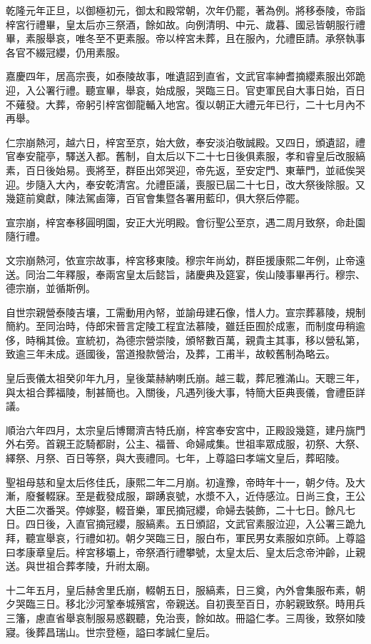 \begin{pinyinscope}
乾隆元年正旦，以御極初元，御太和殿常朝，次年仍罷，著為例。將移泰陵，帝詣梓宮行禮畢，皇太后亦三祭酒，餘如故。向例清明、中元、歲暮、國忌皆朝服行禮畢，素服舉哀，唯冬至不更素服。帝以梓宮未葬，且在服內，允禮臣請。承祭執事各官不綴冠纓，仍用素服。

嘉慶四年，居高宗喪，如泰陵故事，唯遺詔到直省，文武官率紳耆摘纓素服出郊跪迎，入公署行禮。聽宣畢，舉哀，始成服，哭臨三日。官吏軍民自大事日始，百日不薙發。大葬，帝躬引梓宮御龍輴入地宮。復以朝正大禮元年已行，二十七月內不再舉。

仁宗崩熱河，越六日，梓宮至京，始大斂，奉安淡泊敬誠殿。又四日，頒遺詔，禮官奉安龍亭，驛送入都。舊制，自太后以下二十七日後俱素服，孝和睿皇后改服縞素，百日後始易。喪將至，群臣出郊哭迎，帝先返，至安定門、東華門，並祗俟哭迎。步隨入大內，奉安乾清宮。允禮臣議，喪服已屆二十七日，改大祭後除服。又幾筵前奠獻，陳法駕鹵簿，百官會集暨各署用藍印，俱大祭后停罷。

宣宗崩，梓宮奉移圓明園，安正大光明殿。會衍聖公至京，遇二周月致祭，命赴園隨行禮。

文宗崩熱河，依宣宗故事，梓宮移東陵。穆宗年尚幼，群臣援康熙二年例，止帝遠送。同治二年釋服，奉兩宮皇太后懿旨，諸慶典及筵宴，俟山陵事畢再行。穆宗、德宗崩，並循斯例。

自世宗親營泰陵吉壤，工需動用內帑，並諭毋建石像，惜人力。宣宗葬慕陵，規制簡約。至同治時，侍郎宋晉言定陵工程宜法慕陵，雖廷臣囿於成憲，而制度毋稍逾侈，時稱其儉。宣統初，為德宗營崇陵，頒帑數百萬，親貴主其事，移以營私第，致逾三年未成。遜國後，當道撥款營治，及葬，工甫半，故較舊制為略云。

皇后喪儀太祖癸卯年九月，皇後葉赫納喇氏崩。越三載，葬尼雅滿山。天聰三年，與太祖合葬福陵，制甚簡也。入關後，凡遇列後大事，特簡大臣典喪儀，會禮臣詳議。

順治六年四月，太宗皇后博爾濟吉特氏崩，梓宮奉安宮中，正殿設幾筵，建丹旐門外右旁。首親王訖騎都尉，公主、福晉、命婦咸集。世祖率眾成服，初祭、大祭、繹祭、月祭、百日等祭，與大喪禮同。七年，上尊謚曰孝端文皇后，葬昭陵。

聖祖母慈和皇太后佟佳氏，康熙二年二月崩。初違豫，帝時年十一，朝夕侍。及大漸，廢餐輟寐。至是截發成服，躃踴哀號，水漿不入，近侍感泣。日尚三食，王公大臣二次番哭。停嫁娶，輟音樂，軍民摘冠纓，命婦去裝飾，二十七日。餘凡七日。四日後，入直官摘冠纓，服縞素。五日頒詔，文武官素服泣迎，入公署三跪九拜，聽宣舉哀，行禮如初。朝夕哭臨三日，服白布，軍民男女素服如京師。上尊謚曰孝康章皇后。梓宮移壩上，帝祭酒行禮攀號，太皇太后、皇太后念帝沖齡，止親送。與世祖合葬孝陵，升祔太廟。

十二年五月，皇后赫舍里氏崩，輟朝五日，服縞素，日三奠，內外會集服布素，朝夕哭臨三日。移北沙河鞏奉城殯宮，帝親送。自初喪至百日，亦躬親致祭。時用兵三籓，慮直省舉哀制服易惑觀聽，免治喪，餘如故。冊謚仁孝。三周後，致祭如陵寢。後葬昌瑞山。世宗登極，謚曰孝誠仁皇后。


\end{pinyinscope}

